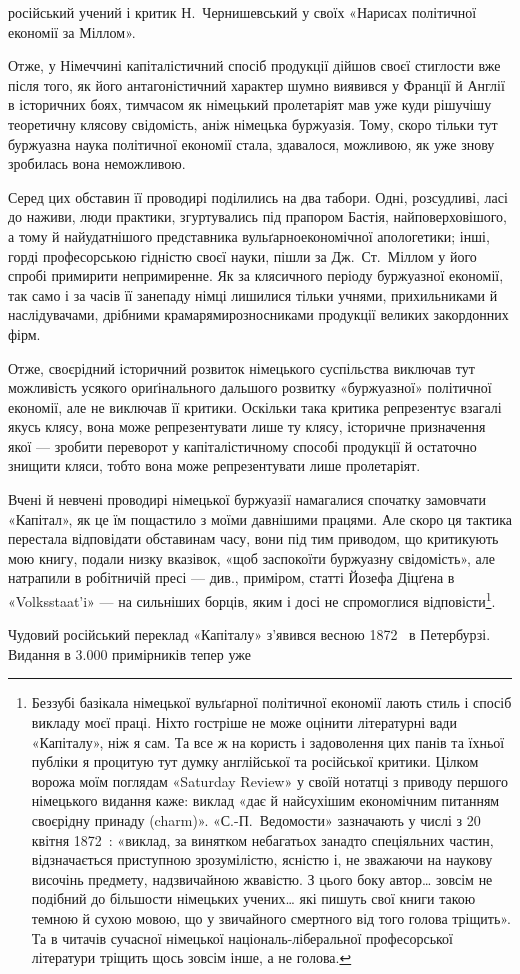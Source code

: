 \parcont{}  %
російський учений і критик Н.~Чернишевський у своїх «Нарисах
політичної економії за Міллом».

Отже, у Німеччині капіталістичний спосіб продукції дійшов
своєї стиглости вже після того, як його антагоністичний характер
шумно виявився у Франції й Англії в історичних боях, тимчасом
як німецький пролетаріят мав уже куди рішучішу теоретичну
клясову свідомість, аніж німецька буржуазія. Тому, скоро тільки
тут буржуазна наука політичної економії стала, здавалося, можливою,
як уже знову зробилась вона неможливою.

Серед цих обставин її проводирі поділились на два табори.
Одні, розсудливі, ласі до наживи, люди практики, згуртувались
під прапором Бастія, найповерховішого, а тому й найудатнішого
представника вульґарно\dash{}економічної апологетики; інші, горді
професорською гідністю своєї науки, пішли за Дж.~Ст.~Міллом у
його спробі примирити непримиренне. Як за клясичного періоду
буржуазної економії, так само і за часів її занепаду німці лишилися
тільки учнями, прихильниками й наслідувачами, дрібними
крамарями\dash{}розносниками продукції великих закордонних фірм.

Отже, своєрідний історичний розвиток німецького суспільства
виключав тут можливість усякого ориґінального дальшого розвитку
«буржуазної» політичної економії, але не виключав її
критики. Оскільки така критика репрезентує взагалі якусь клясу,
вона може репрезентувати лише ту клясу, історичне призначення
якої — зробити переворот у капіталістичному способі продукції
й остаточно знищити кляси, тобто вона може репрезентувати лише
пролетаріят.

Вчені й невчені проводирі німецької буржуазії намагалися
спочатку замовчати «Капітал», як це їм пощастило з моїми давнішими
працями. Але скоро ця тактика перестала відповідати
обставинам часу, вони під тим приводом, що критикують мою
книгу, подали низку вказівок, «щоб заспокоїти буржуазну свідомість»,
але натрапили в робітничій пресі — див., приміром,
статті Йозефа Діцґена в «Volksstaat’i» — на сильніших борців,
яким і досі не спромоглися відповісти\footnote{
Беззубі базікала німецької вульґарної політичної економії лають
стиль і спосіб викладу моєї праці. Ніхто гостріше не може оцінити літературні
вади «Капіталу», ніж я сам. Та все ж на користь і задоволення
цих панів та їхньої публіки я процитую тут думку англійської та російської
критики. Цілком ворожа моїм поглядам «Saturday Review» у своїй
нотатці з приводу першого німецького видання каже: виклад «дає й
найсухішим економічним питанням своєрідну принаду (charm)». «С.-П.~Ведомости» зазначають у числі з 20 квітня 1872~: «виклад, за винятком
небагатьох занадто спеціяльних частин, відзначається приступною зрозумілістю,
ясністю і, не зважаючи на наукову височінь предмету, надзвичайною
жвавістю. З цього боку автор\dots{} зовсім не подібний до більшости
німецьких учених\dots{} які пишуть свої книги такою темною й сухою мовою,
що у звичайного смертного від того голова тріщить». Та в читачів сучасної
німецької національ-ліберальної професорської літератури тріщить
щось зовсім інше, а не голова.
}.

Чудовий російський переклад «Капіталу» з’явився весною
1872~ в Петербурзі. Видання в \num{3.000} примірників тепер уже
\parbreak{}  %
